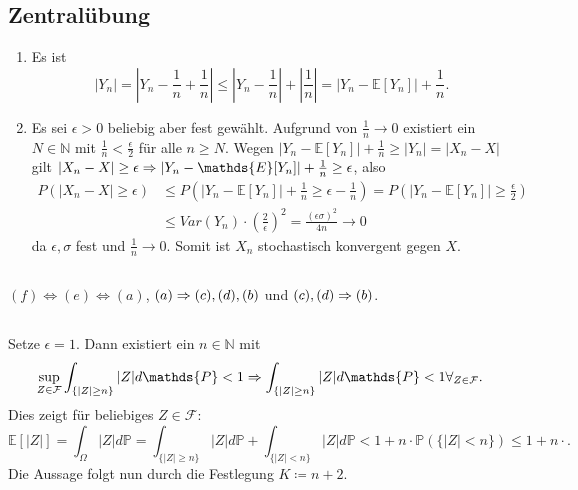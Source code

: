 \documentclass[a4paper]{article}
\begin{document}
\makeexheader

\subsection{Zentralübung}

\begin{enumerate}[label=(\alph*)]
    \item Es ist 
    \begin{equation*}
        |Y_n| = \left|Y_n - \frac{1}{n} + \frac{1}{n}\right| \leq \left| Y_n - \frac{1}{n} \right| + \left| \frac{1}{n} \right| = |Y_n - \mathds{E}[Y_n]| + \frac{1}{n}\text{.}
    \end{equation*}
    \item Es sei $\epsilon > 0$ beliebig aber fest gewählt.
    Aufgrund von $\frac{1}{n} \to 0$ existiert ein $N \in \mathds{N}$ mit $\frac{1}{n} < \frac{\epsilon}{2}$ für alle $n \geq N$.
    Wegen $|Y_n - \mathds{E}[Y_n]| + \frac{1}{n} \geq |Y_n| = |X_n - X|$ gilt $|X_n - X| \geq \epsilon \then |Y_n - \mathds{E}[Y_n]| + \frac{1}{n} \geq \epsilon$, also 
    \begin{align*}
        P(|X_n - X| \geq \epsilon) &\leq P(|Y_n - \mathds{E}[Y_n]| + \frac{1}{n} \geq \epsilon - \frac{1}{n}) = P(|Y_n - \mathds{E}[Y_n]| \geq \frac{\epsilon}{2}) \\
        &\leq Var(Y_n) \cdot \left(\frac{2}{\epsilon}\right)^2 = \frac{(\epsilon \sigma)^2}{4n} \to 0
    \end{align*}
    da $\epsilon, \sigma$ fest und $\frac{1}{n} \to 0$.
    Somit ist $X_n$ stochastisch konvergent gegen $X$.
\end{enumerate}

\subsection{}

$(f) \iff (e) \iff (a)$, $(a) \Rightarrow (c), (d), (b)$ und $(c),(d) \Rightarrow (b)$.

\subsection{}

Setze $\epsilon = 1$. Dann existiert ein $n \in \mathds{N}$ mit
\begin{equation*}
    \sup_{Z \in \mathcal{F}} \int_{\{|Z| \geq n\}} |Z| d\mathds{P} < 1  \then 
    \int_{\{|Z| \geq n\}} |Z| d\mathds{P} < 1 \forall_{Z \in \mathcal{F}}\text{.}
\end{equation*}
Dies zeigt für beliebiges $Z \in \mathcal{F}$:
\begin{equation*}
    \mathds{E}[|Z|] = \int_\Omega |Z| d\mathds{P} = \int_{\{|Z| \geq n\}} |Z| d\mathds{P} + \int_{\{|Z| < n\}} |Z| d\mathds{P} < 1 + n \cdot \mathds{P}(\{|Z| < n\}) \leq 1 + n \cdot  \text{.}
\end{equation*}
Die Aussage folgt nun durch die Festlegung $K \coloneq n+2$.
\end{document}
